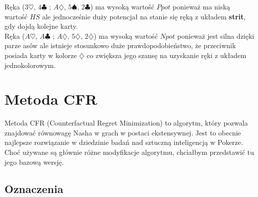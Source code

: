 \documentclass[licencjacka]{pracamgr}
\begin{document}
\noindent
Ręka ($3\heartsuit$, $4\clubsuit$ ; $A\diamondsuit$, $5\spadesuit$, $2\clubsuit$) ma wysoką wartość $Ppot$ ponieważ ma niską wartość $HS$
ale jednocześnie duży potencjał na stanie się ręką z układem \textbf{strit}, gdy dojdą kolejne karty. \\

\noindent
Ręka ($A\heartsuit$, $A\clubsuit$ ; $A\diamondsuit$, $5\diamondsuit$, $2\diamondsuit$) ma wysoką wartość $Npot$ ponieważ jest silna
dzięki parze asów ale istnieje stosunkowo duże prawdopodobieństwo, że przeciwnik posiada karty w kolorze $\diamondsuit$ co zwiększa jego szansę
na uzyskanie ręki z układem jednokolorowym.


\chapter{Metoda CFR}

Metoda CFR (Counterfactual Regret Minimization) to algorytm, który pozwala znajdować równowagę Nasha
w grach w postaci ekstensywnej. Jest to obecnie najlepsze rozwiązanie w dziedzinie badań nad
sztuczną inteligencją w Pokerze. Choć używane są głównie różne modyfikacje algorytmu, chciałbym
przedstawić tu jego bazową wersję.

\section{Oznaczenia}
\end{document}
